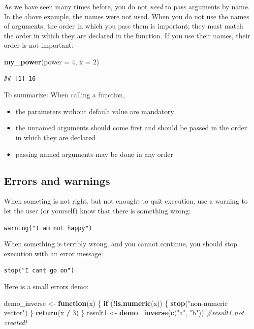 \documentclass[]{book}
\newenvironment{Shaded}{\begin{snugshade}}{\end{snugshade}}
\newcommand{\CommentTok}[1]{\textcolor[rgb]{0.56,0.35,0.01}{\textit{#1}}}
\newcommand{\ControlFlowTok}[1]{\textcolor[rgb]{0.13,0.29,0.53}{\textbf{#1}}}
\newcommand{\DataTypeTok}[1]{\textcolor[rgb]{0.13,0.29,0.53}{#1}}
\newcommand{\DecValTok}[1]{\textcolor[rgb]{0.00,0.00,0.81}{#1}}
\newcommand{\KeywordTok}[1]{\textcolor[rgb]{0.13,0.29,0.53}{\textbf{#1}}}
\newcommand{\NormalTok}[1]{#1}
\newcommand{\OperatorTok}[1]{\textcolor[rgb]{0.81,0.36,0.00}{\textbf{#1}}}
\newcommand{\StringTok}[1]{\textcolor[rgb]{0.31,0.60,0.02}{#1}}
\providecommand{\tightlist}{%
  \setlength{\itemsep}{0pt}\setlength{\parskip}{0pt}}
\begin{document}
As we have seen many times before, you do not \emph{need} to pass arguments by name. In the above example, the names were not used. When you do not use the names of arguments, the order in which you pass them is important; they must match the order in which they are declared in the function. If you use their names, their order is not important:

\begin{Shaded}
\begin{Highlighting}[]
\KeywordTok{my_power}\NormalTok{(}\DataTypeTok{power =} \DecValTok{4}\NormalTok{, }\DataTypeTok{x =} \DecValTok{2}\NormalTok{)}
\end{Highlighting}
\end{Shaded}

\begin{verbatim}
## [1] 16
\end{verbatim}

To summarize: When calling a function,

\begin{itemize}
\tightlist
\item
  the parameters without default value are mandatory
\item
  the unnamed arguments should come first and should be passed in the order in which they are declared
\item
  passing named arguments may be done in any order
\end{itemize}

\hypertarget{errors-and-warnings}{%
\subsection{Errors and warnings}\label{errors-and-warnings}}

When someting is not right, but not enought to quit execution, use a warning to let the user (or yourself) know that there is something wrong:

\texttt{warning("I\ am\ not\ happy")}

When something is terribly wrong, and you cannot continue, you should stop execution with an error message:

\texttt{stop("I\ can\textquotesingle{}t\ go\ on")}

Here is a small errors demo:

\begin{Shaded}
\begin{Highlighting}[]
\NormalTok{demo_inverse <-}\StringTok{ }\ControlFlowTok{function}\NormalTok{(x) \{}
    \ControlFlowTok{if}\NormalTok{ (}\OperatorTok{!}\KeywordTok{is.numeric}\NormalTok{(x)) \{}
        \KeywordTok{stop}\NormalTok{(}\StringTok{"non-numeric vector"}\NormalTok{)}
\NormalTok{    \}}
    \KeywordTok{return}\NormalTok{(x }\OperatorTok{/}\StringTok{ }\DecValTok{3}\NormalTok{)}
\NormalTok{\}}
\NormalTok{result1 <-}\StringTok{ }\KeywordTok{demo_inverse}\NormalTok{(}\KeywordTok{c}\NormalTok{(}\StringTok{"a"}\NormalTok{, }\StringTok{"b"}\NormalTok{)) }\CommentTok{#result1 not created!}
\end{Highlighting}
\end{Shaded}
\end{document}
